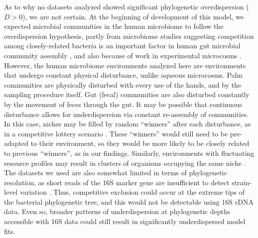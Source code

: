 \documentclass{article}
\begin{document}
As to why no datasets analyzed showed significant phylogenetic overdispersion (\(D > 0\)), we are not certain. At the beginning of development of this model, we expected microbial communities in the human microbiome to follow the overdispersion hypothesis, partly from microbiome studies suggesting competition among closely-related bacteria is an important factor in human gut microbial community assembly \cite{Chatzidaki-Livanis3627,Hecht1281}, and also because of work in experimental microcosms \cite{Peay2012}. However, the human microbiome environments analyzed here are environments that undergo constant physical disturbance, unlike aqueous microcosms. Palm communities are physically disturbed with every use of the hands, and by the sampling procedure itself. Gut (fecal) communities are also disturbed constantly by the movement of feces through the gut. It may be possible that continuous disturbance allows for underdispersion via constant re-assembly of communities. In this case, niches may be filled by random “winners” after each disturbance, as in a competitive lottery scenario \cite{Verster2018}. These “winners” would still need to be pre-adapted to their environment, so they would be more likely to be closely related to previous “winners”, as in our findings. Similarly, environments with fluctuating resource profiles may result in clusters of organisms occupying the same niche \cite{Sakavara738}. The datasets we used are also somewhat limited in terms of phylogenetic resolution, as short reads of the 16S marker gene are insufficient to detect strain-level variation \cite{Morowitz1128,Hecht1281,Tett2019}. Thus, competitive exclusion could occur at the extreme tips of the bacterial phylogenetic tree, and this would not be detectable using 16S rDNA data. Even so, broader patterns of underdispersion at phylogenetic depths accessible with 16S data could still result in significantly underdispersed model fits.
\par
\end{document}
